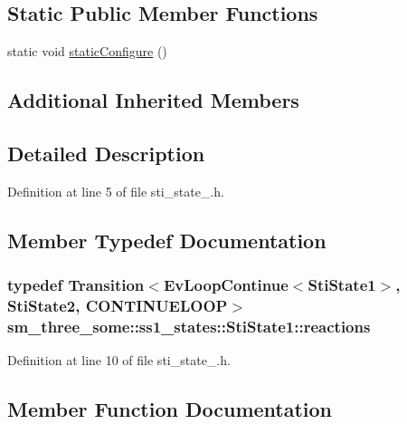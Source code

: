\subsection*{Static Public Member Functions}
\begin{DoxyCompactItemize}
\item 
static void \hyperlink{structsm__three__some_1_1ss1__states_1_1StiState1_a0e160d19f55f0dd645892f7a46cff33a}{static\+Configure} ()
\end{DoxyCompactItemize}
\subsection*{Additional Inherited Members}


\subsection{Detailed Description}


Definition at line 5 of file sti\+\_\+state\+\_.\+h.



\subsection{Member Typedef Documentation}
\subsubsection[{\texorpdfstring{reactions}{reactions}}]{\setlength{\rightskip}{0pt plus 5cm}typedef Transition$<$Ev\+Loop\+Continue$<${\bf Sti\+State1}$>$, {\bf Sti\+State2}, C\+O\+N\+T\+I\+N\+U\+E\+L\+O\+OP$>$ {\bf sm\+\_\+three\+\_\+some\+::ss1\+\_\+states\+::\+Sti\+State1\+::reactions}}\hypertarget{structsm__three__some_1_1ss1__states_1_1StiState1_aa86a8bb06736fba512abc8842f26fe1c}{}\label{structsm__three__some_1_1ss1__states_1_1StiState1_aa86a8bb06736fba512abc8842f26fe1c}


Definition at line 10 of file sti\+\_\+state\+\_.\+h.



\subsection{Member Function Documentation}
